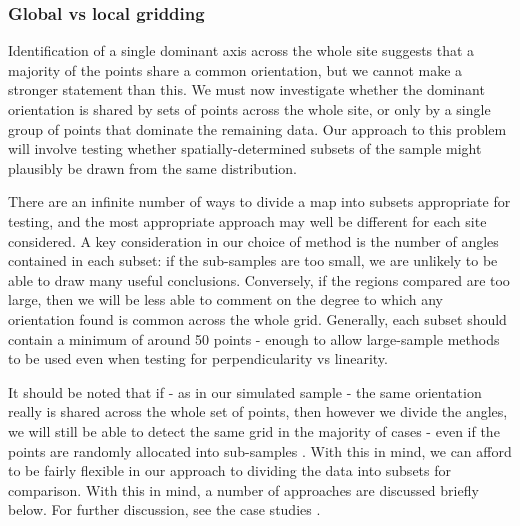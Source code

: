 \documentclass[../../ArchStats.tex]{subfiles}
\begin{document}
\subsubsection{Global vs local gridding}
\label{sec:global-gridding}



Identification of a single dominant axis across the whole site suggests that a majority of the points share a common orientation, but we cannot make a stronger statement than this. We must now investigate whether the dominant orientation is shared by sets of points across the whole site, or only by a single group of points that dominate the remaining data. Our approach to this problem will involve testing whether spatially-determined subsets of the sample might plausibly be drawn from the same distribution.

There are an infinite number of ways to divide a map into subsets appropriate for testing, and the most appropriate approach may well be different for each site considered. A key consideration in our choice of method is the number of angles contained in each subset: if the sub-samples are too small, we are unlikely to be able to draw many useful conclusions. Conversely, if the regions compared are too large, then we will be less able to comment on the degree to which any orientation found is common across the whole grid.  Generally, each subset should contain a minimum of around 50 points - enough to allow large-sample methods to be used even when testing for perpendicularity vs linearity.

It should be noted that if - as in our simulated sample - the same orientation really is shared across the whole set of points, then however we divide the angles, we will still be able to detect the same grid in the majority of cases - even if the points are randomly allocated into sub-samples . With this in mind, we can afford to be fairly flexible in our approach to dividing the data into subsets for comparison. With this in mind, a number of approaches are discussed briefly below. For further discussion, see the case studies .
\end{document}
